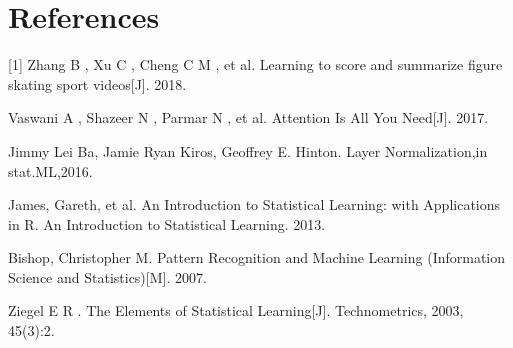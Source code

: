 \documentclass{article}
\begin{document}
\section*{References}
\small

[1] Zhang B , Xu C , Cheng C M , et al. Learning to score and summarize figure skating sport videos[J]. 2018.\par
[2] Vaswani A , Shazeer N , Parmar N , et al. Attention Is All You Need[J]. 2017.\par
[3] Jimmy Lei Ba, Jamie Ryan Kiros, Geoffrey E. Hinton. Layer Normalization,in stat.ML,2016.\par
[4] James, Gareth, et al. An Introduction to Statistical Learning: with Applications in R. An Introduction to Statistical Learning. 2013.\par
[5] Bishop, Christopher M. Pattern Recognition and Machine Learning (Information Science and Statistics)[M]. 2007.\par
[6] Ziegel E R . The Elements of Statistical Learning[J]. Technometrics, 2003, 45(3):2.
\end{document}
